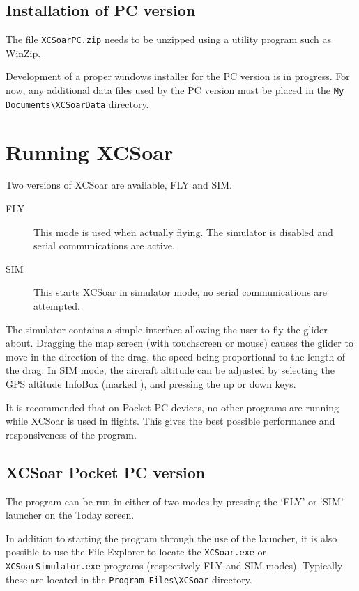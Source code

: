 \documentclass[a4paper,12pt]{refrep}
\newcommand{\InfoBox}[0]{{InfoBox}}
\begin{document}
\subsection*{Installation of PC version}

The file \verb|XCSoarPC.zip| needs to be unzipped using a utility
program such as WinZip.

Development of a proper windows installer for the PC version is in
progress.  For now, any additional data files used by the PC version
must be placed in the \verb|My Documents\XCSoarData| directory.

\section{Running XCSoar}

Two versions of XCSoar are available, FLY and SIM. 
\begin{description}
\item[FLY] This mode is used when actually flying.  The simulator is 
  disabled and serial communications are active. 
\item[SIM] This starts XCSoar in simulator mode, no serial communications
  are attempted.
\end{description}

The simulator contains a simple interface allowing the user to fly
the glider about.  Dragging the map screen (with touchscreen or
mouse) causes the glider to move in the direction of the drag, the
speed being proportional to the length of the drag.  In SIM mode, the
aircraft altitude can be adjusted by selecting the GPS altitude
{\InfoBox} (marked ), and pressing the up or down keys.

\tip It is recommended that on Pocket PC devices, no other programs
 are running while XCSoar is used in flights.  This gives the best
 possible performance and responsiveness of the program.

\subsection*{XCSoar Pocket PC version}
The program can be run in either of two modes by pressing the `FLY' or
`SIM' launcher on the Today screen.

In addition to starting the program through the use of the launcher,
it is also possible to use the File Explorer to locate the
\verb|XCSoar.exe| or \verb|XCSoarSimulator.exe| programs 
(respectively FLY and SIM modes).  Typically these are located in the
\verb|Program Files\XCSoar| directory.
\end{document}
